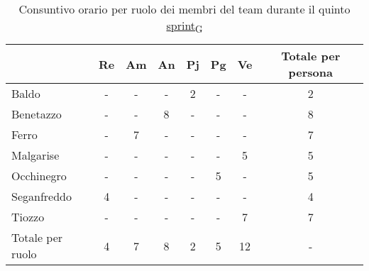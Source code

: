  \begin{table}[!h]
     \centering
     \begin{tabular}{ | l | c | c | c | c | c | c | c | }
         \hline
         \textbf{} & \textbf{Re} & \textbf{Am} &\textbf{An} & \textbf{Pj} & \textbf{Pg} & \textbf{Ve} & \textbf{Totale per persona} \\
         \hline
         Baldo            &  -   &  -   &  -   &  2   &  -   &  -   &  2   \\
         Benetazzo        &  -   &  -   &  8   &  -   &  -   &  -   &  8   \\
         Ferro            &  -   &  7   &  -   &  -   &  -   &  -   &  7   \\
         Malgarise        &  -   &  -   &  -   &  -   &  -   &  5   &  5   \\
         Occhinegro       &  -   &  -   &  -   &  -   &  5   &  -   &  5   \\
         Seganfreddo      &  4   &  -   &  -   &  -   &  -   &  -   &  4   \\
         Tiozzo           &  -   &  -   &  -   &  -   &  -   &  7   &  7   \\
         \hline
         Totale per ruolo &  4   &  7   &  8   &  2   &  5   &  12   &  -   \\
         \hline
     \end{tabular}
     \caption{Consuntivo orario per ruolo dei membri del team durante il quinto \href{https://7last.github.io/docs/rtb/documentazione-interna/glossario\#sprint}{sprint\textsubscript{G}}} %
 \end{table}

